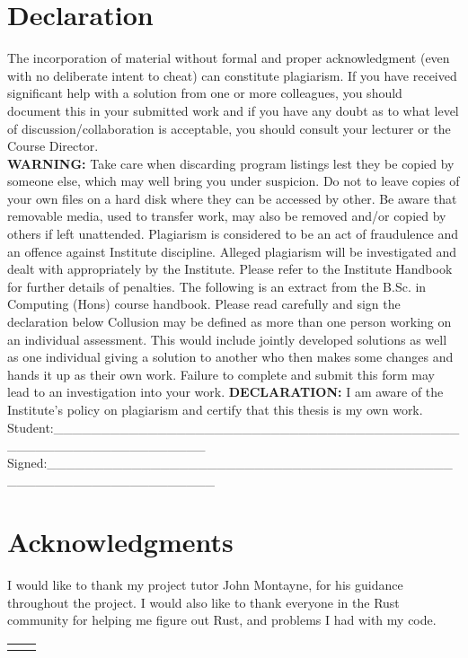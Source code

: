 \documentclass[a4paper, 12pt, oneside]{book}
\makeatletter
\newcommand{\listofacronyms}[1][tabular]{%
  \begingroup\def\@elt##1##2{##1&##2\\}%
  \@ifundefined{chapter}{\section*}{\chapter*}{\listacronymname}
  \noindent\begin{#1}{@{}p{6em}p{\dimexpr\columnwidth-2\tabcolsep-6em\relax}@{}}
    \the\acro@list
  \end{#1}\endgroup}
\providecommand\listacronymname{List of abbreviations}
\makeatother
\begin{document}
   \chapter*{Declaration}
  The incorporation of material without formal and proper acknowledgment (even with no deliberate intent to cheat) can constitute plagiarism.
  If you have received significant help with a solution from one or more colleagues, you should document this in your submitted work and if you have any doubt as to what level of discussion/collaboration is acceptable, you should consult your lecturer or the Course Director.\\
  \textbf{WARNING:} Take care when discarding program listings lest they be copied by someone else, which may well bring you under suspicion. Do not to leave copies of your own files on a hard disk where they can be accessed by other. Be aware that removable media, used to transfer work, may also be removed and/or copied by others if left unattended. Plagiarism is considered to be an act of fraudulence and an offence against Institute discipline.
  Alleged plagiarism will be investigated and dealt with appropriately by the Institute. Please refer to the Institute Handbook for further details of penalties. The following is an extract from the B.Sc. in Computing (Hons) course handbook. Please read carefully and sign the declaration below
  Collusion may be defined as more than one person working on an individual assessment. This would include jointly developed solutions as well as one individual giving a solution to another who then makes some changes and hands it up as their own work. Failure to complete and submit this form may lead to an investigation into your work.
  \textbf{DECLARATION:} 
  I am aware of the Institute's policy on plagiarism and certify that this thesis is my own work.\\
  Student:\_\_\_\_\_\_\_\_\_\_\_\_\_\_\_\_\_\_\_\_\_\_\_\_\_\_\_\_\_\_\_\_\_\_\_\_\_\_\_\_\_\_\_\_\_\_\_\_\_\_\_\_\_\_\_\_\_\_\_\_\_\_\_\_\\
  Signed:\_\_\_\_\_\_\_\_\_\_\_\_\_\_\_\_\_\_\_\_\_\_\_\_\_\_\_\_\_\_\_\_\_\_\_\_\_\_\_\_\_\_\_\_\_\_\_\_\_\_\_\_\_\_\_\_\_\_\_\_\_\_\_\_\_
  \chapter*{Acknowledgments}
  I would like to thank my project tutor John Montayne, for his guidance throughout the project. I would also like to thank everyone in the Rust community for helping me figure out Rust, and problems I had with my code.
  \tableofcontents
  \listoffigures
  \listofacronyms
\end{document}
